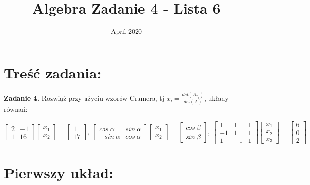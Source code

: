\documentclass{article}
\title{Algebra Zadanie 4 - Lista 6}
\date{April 2020}
\begin{document}
\maketitle

\section*{Treść zadania:}

\textbf{Zadanie 4.} Rozwiąż przy użyciu wzorów Cramera, tj $x_i = 
\frac{det(A_{x_i})}{det(A)}$, układy równań:

\begin{center}
    $\begin{bmatrix}2&-1\\1&16\end{bmatrix}
    \begin{bmatrix}x_1\\x_2\end{bmatrix}=
    \begin{bmatrix}1\\17\end{bmatrix},\ 
    \begin{bmatrix}cos\ \alpha&sin\ \alpha\\-sin\ \alpha&cos\ \alpha\end{bmatrix}
    \begin{bmatrix}x_1\\x_2\end{bmatrix}=
    \begin{bmatrix}cos\ \beta\\sin\ \beta\end{bmatrix},\ 
    \begin{bmatrix}1&1&1\\-1&1&1\\1&-1&1\end{bmatrix}
    \begin{bmatrix}x_1\\x_2\\x_3\end{bmatrix}=
    \begin{bmatrix}6\\0\\2\end{bmatrix}$
\end{center}

\section*{Pierwszy układ:}
\end{document}
